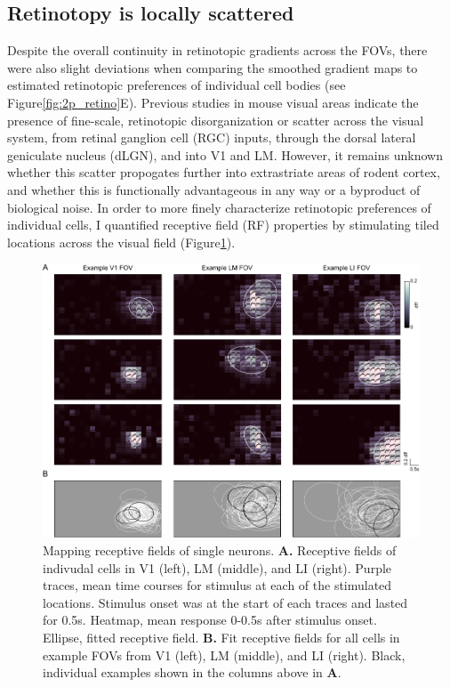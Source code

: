 \subsection{Retinotopy is locally scattered}
Despite the overall continuity in retinotopic gradients across the FOVs, there were also slight deviations when comparing the smoothed gradient maps to estimated retinotopic preferences of individual cell bodies (see Figure\ref{fig:2p_retino}E). Previous studies in mouse visual areas indicate the presence of fine-scale, retinotopic disorganization or scatter across the visual system, from retinal ganglion cell (RGC) inputs, through the dorsal lateral geniculate nucleus (dLGN), and into V1 and LM\cite{Bonin2011, Andermann2011, Liang2018, Marques2018}. However, it remains unknown whether this scatter propogates further into extrastriate areas of rodent cortex, and whether this is functionally advantageous in any way or a byproduct of biological noise. In order to more finely characterize retinotopic preferences of individual cells, I quantified receptive field (RF) properties by stimulating tiled locations across the visual field (Figure\ref{fig:rf_examples}). 

\begin{figure}[t!]
    \includegraphics[width=\textwidth]{figures/chapter_3/fig_3-3_rf_examples/fig_3-3_rf_examples.pdf}
    \vspace{.1in}
    \caption[Receptive field mapping]{Mapping receptive fields of single neurons. \textbf{A.} Receptive fields of indivudal cells in V1 (left), LM (middle), and LI (right). Purple traces, mean time courses for stimulus at each of the stimulated locations. Stimulus onset was at the start of each traces and lasted for 0.5s. Heatmap, mean response 0-0.5s after stimulus onset. Ellipse, fitted receptive field.
    \textbf{B.} Fit receptive fields for all cells in example FOVs from V1 (left), LM (middle), and LI (right). Black, individual examples shown in the columns above in \textbf{A}.
    \label{fig:rf_examples}}
\end{figure}

